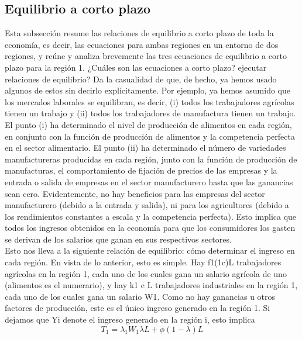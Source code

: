  \subsection{Equilibrio a corto plazo}
 Esta subsección resume las relaciones de equilibrio a corto plazo de toda la economía, es decir, las ecuaciones para ambas regiones en un entorno de dos regiones, y reúne y analiza brevemente las tres ecuaciones de equilibrio a corto plazo para la región 1. ¿Cuáles son las ecuaciones a corto plazo? ejecutar relaciones de equilibrio? Da la casualidad de que, de hecho, ya hemos usado algunos de estos sin decirlo explícitamente. Por ejemplo, ya hemos asumido que los mercados laborales se equilibran, es decir, (i) todos los trabajadores agrícolas tienen un trabajo y (ii) todos los trabajadores de manufactura tienen un trabajo. El punto (i) ha determinado el nivel de producción de alimentos en cada región, en conjunto con la función de producción de alimentos y la competencia perfecta en el sector alimentario. El punto (ii) ha determinado el número de variedades manufactureras producidas en cada región, junto con la función de producción de manufacturas, el comportamiento de fijación de precios de las empresas y la entrada o salida de empresas en el sector manufacturero hasta que las ganancias sean cero. Evidentemente, no hay beneficios para las empresas del sector manufacturero (debido a la entrada y salida), ni para los agricultores (debido a los rendimientos constantes a escala y la competencia perfecta). Esto implica que todos los ingresos obtenidos en la economía para que los consumidores los gasten se derivan de los salarios que ganan en sus respectivos sectores.\\
 Esto nos lleva a la siguiente relación de equilibrio: cómo determinar el ingreso en cada región. En vista de lo anterior, esto es simple. Hay f1(1c)L trabajadores agrícolas en la región 1, cada uno de los cuales gana un salario agrícola de uno (alimentos es el numerario), y hay k1 c L trabajadores industriales en la región 1, cada uno de los cuales gana un salario W1. Como no hay ganancias u otros factores de producción, este es el único ingreso generado en la región 1. Si dejamos que Yi denote el ingreso generado en la región i, esto implica
 $$T_1=\lambda_1 W_1 \lambda L + \phi(1-\lambda)L$$
